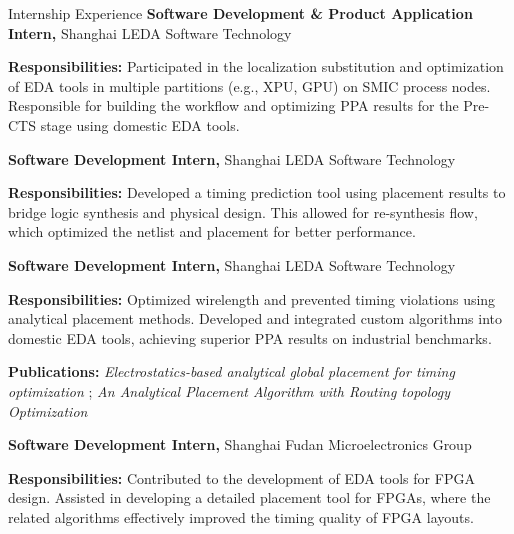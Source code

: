 
\begin{rubric}{Internship Experience}
	\textbf{Software Development \& Product Application Intern,} Shanghai LEDA Software Technology
	\par \textbf{Responsibilities:} Participated in the localization substitution and optimization of EDA tools in multiple partitions (e.g., XPU, GPU) on SMIC process nodes.
	Responsible for building the workflow and optimizing PPA results for the Pre-CTS stage using domestic EDA tools.

	\textbf{Software Development Intern,} Shanghai LEDA Software Technology
	\par \textbf{Responsibilities:} Developed a timing prediction tool using placement results to bridge logic synthesis and physical design.
	This allowed for re-synthesis flow, which optimized the netlist and placement for better performance.

	\textbf{Software Development Intern,} Shanghai LEDA Software Technology
	\par \textbf{Responsibilities:} Optimized wirelength and prevented timing violations using analytical placement methods.
	Developed and integrated custom algorithms into domestic EDA tools, achieving superior PPA results on industrial benchmarks.
	\par \textbf{Publications:} \emph{Electrostatics-based analytical global placement for timing optimization} \cite{lin2024electrostatics}; \emph{An Analytical Placement Algorithm with Routing topology Optimization} \cite{wei2024analytical}

	\textbf{Software Development Intern,} Shanghai Fudan Microelectronics Group
	\par \textbf{Responsibilities:} Contributed to the development of EDA tools for FPGA design.
	Assisted in developing a detailed placement tool for FPGAs, where the related algorithms effectively improved the timing quality of FPGA layouts.

\end{rubric}
